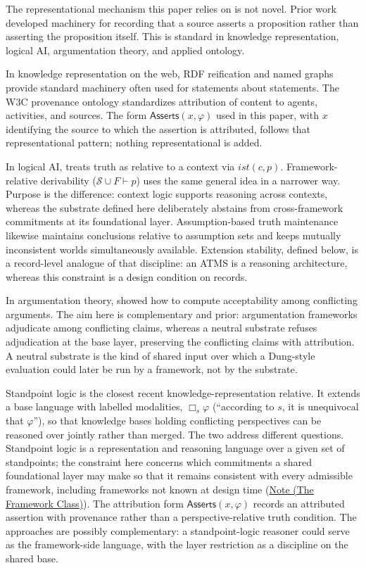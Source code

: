 \documentclass[11pt]{article}
\theoremstyle{plain}
\theoremstyle{definition}
\theoremstyle{remark}
\newcommand{\NoteRef}[2]{\hyperref[#1]{Note (#2)}}
\newcommand{\Substrate}{\mathcal{S}}
\newcommand{\Framework}{F}
\newcommand{\entails}{\vdash}
\newcommand{\Asserts}{\mathsf{Asserts}}
\begin{document}
The representational mechanism this paper relies on is not novel.
Prior work developed machinery for
recording that a source asserts a proposition
rather than asserting the proposition itself.
This is standard in knowledge representation,
logical AI,
argumentation theory,
and applied ontology.

In knowledge representation on the web,
RDF reification \citep{hayes2004rdf}
and named graphs \citep{carroll2005named}
provide standard machinery often used for
statements about statements.
The W3C provenance ontology
\citep{lebo2013prov} standardizes attribution of content to
agents, activities, and sources.
The form $\Asserts(x,\varphi)$ used in this paper,
with $x$ identifying the source to which the assertion is attributed,
follows that representational pattern;
nothing representational is added.

In logical AI, \citet{mccarthy1993} treats truth as relative to a context via
$\mathit{ist}(c,p)$.
Framework-relative derivability
($\Substrate \cup \Framework \entails p$)
uses the same general idea in a narrower way.
Purpose is the difference:
context logic supports reasoning across contexts,
whereas the substrate defined here deliberately abstains from
cross-framework commitments at its foundational layer.
Assumption-based truth maintenance \citep{dekleer1986atms}
likewise maintains conclusions relative to assumption sets
and keeps mutually inconsistent worlds simultaneously available.
Extension stability, defined below,
is a record-level analogue of that discipline:
an ATMS is a reasoning architecture,
whereas this constraint is a design condition on records.

In argumentation theory, \citet{dung1995} showed how to compute acceptability
among conflicting arguments.
The aim here is complementary and prior:
argumentation frameworks adjudicate among conflicting claims,
whereas a neutral substrate refuses adjudication at the base layer,
preserving the conflicting claims with attribution.
A neutral substrate is the kind of shared input over
which a Dung-style evaluation could later be run by a framework,
not by the substrate.

Standpoint logic \citep{gomezalvarez2021standpoint} is the closest recent
knowledge-representation relative.
It extends a base language with labelled modalities,
$\Box_s\varphi$ (``according to $s$, it is unequivocal that $\varphi$''),
so that knowledge bases holding conflicting perspectives can
be reasoned over jointly rather than merged.
The two address different questions.
Standpoint logic is a representation and reasoning language
over a given set of standpoints;
the constraint here concerns which commitments
a shared foundational layer may make so that it
remains consistent with every admissible framework,
including frameworks not known at design time
(\NoteRef{se100.note.FrameworkClass}{The Framework Class}).
The attribution form $\Asserts(x,\varphi)$ records an attributed assertion
with provenance rather than a perspective-relative truth condition.
The approaches are possibly complementary:
a standpoint-logic reasoner could serve as the framework-side language,
with the layer restriction as a discipline on the shared base.
\end{document}
